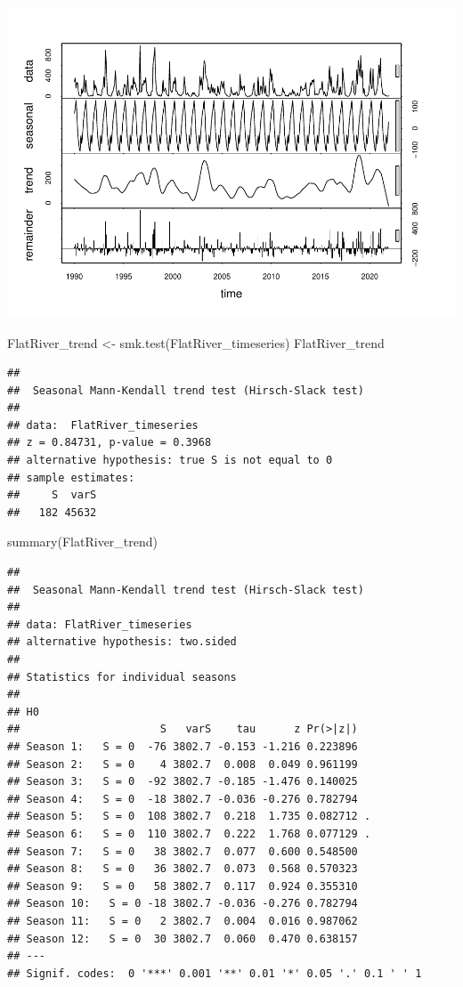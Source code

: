\documentclass[
  12pt,
]{article}
\newenvironment{Shaded}{\begin{snugshade}}{\end{snugshade}}
\newcommand{\FunctionTok}[1]{\textcolor[rgb]{0.00,0.00,0.00}{#1}}
\newcommand{\NormalTok}[1]{#1}
\newcommand{\OtherTok}[1]{\textcolor[rgb]{0.56,0.35,0.01}{#1}}
\begin{document}
\includegraphics{Project_files/figure-latex/time-series analysis on Regular Water Resources-2.pdf}

\begin{Shaded}
\begin{Highlighting}[]
\NormalTok{FlatRiver\_trend }\OtherTok{\textless{}{-}} \FunctionTok{smk.test}\NormalTok{(FlatRiver\_timeseries)}
\NormalTok{FlatRiver\_trend}
\end{Highlighting}
\end{Shaded}

\begin{verbatim}
## 
##  Seasonal Mann-Kendall trend test (Hirsch-Slack test)
## 
## data:  FlatRiver_timeseries
## z = 0.84731, p-value = 0.3968
## alternative hypothesis: true S is not equal to 0
## sample estimates:
##     S  varS 
##   182 45632
\end{verbatim}

\begin{Shaded}
\begin{Highlighting}[]
\FunctionTok{summary}\NormalTok{(FlatRiver\_trend)}
\end{Highlighting}
\end{Shaded}

\begin{verbatim}
## 
##  Seasonal Mann-Kendall trend test (Hirsch-Slack test)
## 
## data: FlatRiver_timeseries
## alternative hypothesis: two.sided
## 
## Statistics for individual seasons
## 
## H0
##                      S   varS    tau      z Pr(>|z|)  
## Season 1:   S = 0  -76 3802.7 -0.153 -1.216 0.223896  
## Season 2:   S = 0    4 3802.7  0.008  0.049 0.961199  
## Season 3:   S = 0  -92 3802.7 -0.185 -1.476 0.140025  
## Season 4:   S = 0  -18 3802.7 -0.036 -0.276 0.782794  
## Season 5:   S = 0  108 3802.7  0.218  1.735 0.082712 .
## Season 6:   S = 0  110 3802.7  0.222  1.768 0.077129 .
## Season 7:   S = 0   38 3802.7  0.077  0.600 0.548500  
## Season 8:   S = 0   36 3802.7  0.073  0.568 0.570323  
## Season 9:   S = 0   58 3802.7  0.117  0.924 0.355310  
## Season 10:   S = 0 -18 3802.7 -0.036 -0.276 0.782794  
## Season 11:   S = 0   2 3802.7  0.004  0.016 0.987062  
## Season 12:   S = 0  30 3802.7  0.060  0.470 0.638157  
## ---
## Signif. codes:  0 '***' 0.001 '**' 0.01 '*' 0.05 '.' 0.1 ' ' 1
\end{verbatim}
\end{document}
